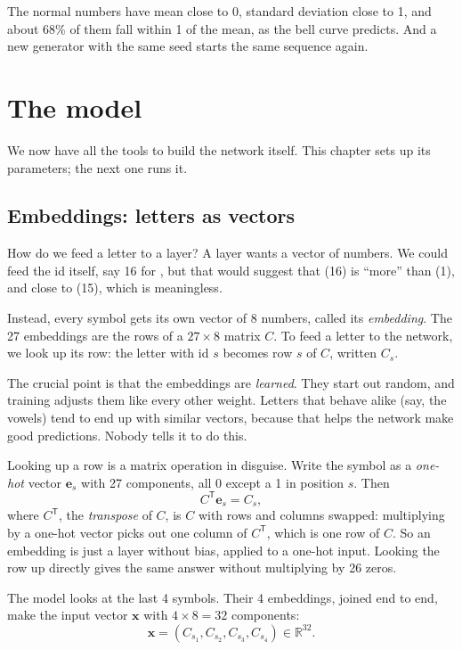 \documentclass[11pt,a4paper,oneside,openany]{book}
\newcommand{\code}[1]{\texttt{\detokenize{#1}}}
\newcommand{\R}{\mathbb{R}}
\newcommand{\vect}[1]{\mathbf{#1}}
\begin{document}
The normal numbers have mean close to 0, standard deviation close to 1,
and about 68\% of them fall within 1 of the mean, as the bell curve
predicts. And a new generator with the same seed starts the same sequence
again.

\chapter{The model}

We now have all the tools to build the network itself. This chapter sets
up its parameters; the next one runs it.

\section{Embeddings: letters as vectors}

How do we feed a letter to a layer? A layer wants a vector of numbers. We
could feed the id itself, say 16 for \code{p}, but that would suggest that
\code{p} (16) is ``more'' than \code{a} (1), and close to \code{o} (15),
which is meaningless.

Instead, every symbol gets its own vector of 8 numbers, called its
\emph{embedding}. The 27 embeddings are the rows of a $27\times 8$ matrix
$C$. To feed a letter to the network, we look up its row: the letter with
id $s$ becomes row $s$ of $C$, written $C_s$.

The crucial point is that the embeddings are \emph{learned}. They start
out random, and training adjusts them like every other weight. Letters
that behave alike (say, the vowels) tend to end up with similar vectors,
because that helps the network make good predictions. Nobody tells it to
do this.

Looking up a row is a matrix operation in disguise. Write the symbol as a
\emph{one-hot} vector $\vect{e}_s$ with 27 components, all 0 except a 1 in
position $s$. Then
\[
  C^{\mathsf T}\vect{e}_s = C_s ,
\]
where $C^{\mathsf T}$, the \emph{transpose} of $C$, is $C$ with rows and
columns swapped: multiplying by a one-hot vector picks out one column of
$C^{\mathsf T}$, which is one row of $C$. So an embedding is just a layer
without bias, applied to a one-hot input. Looking the row up directly
gives the same answer without multiplying by 26 zeros.

The model looks at the last 4 symbols. Their 4 embeddings, joined end to
end, make the input vector $\vect{x}$ with $4 \times 8 = 32$ components:
\[
  \vect{x} = (C_{s_1}, C_{s_2}, C_{s_3}, C_{s_4}) \in \R^{32} .
\]
\end{document}
